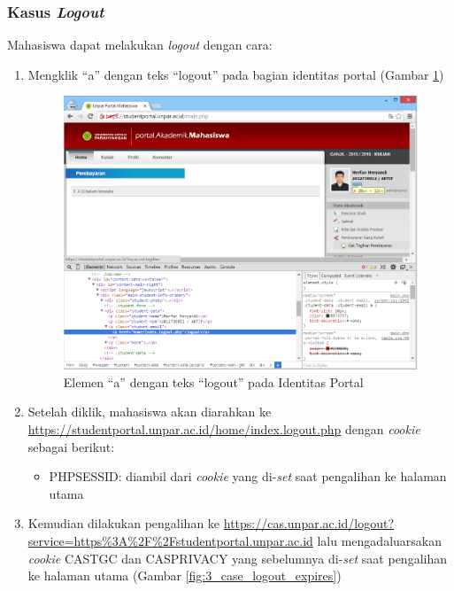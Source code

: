 \subsubsection{Kasus \textit{Logout}}
Mahasiswa dapat melakukan \textit{logout} dengan cara:
\begin{enumerate}
	\item Mengklik ``a'' dengan teks ``logout'' pada bagian identitas portal (Gambar \ref{fig:3_case_logout_link})
	\begin{figure}[H]
			\centering
			\includegraphics[scale=0.4]{Gambar/case-logout-link}
			\caption{Elemen ``a'' dengan teks ``logout'' pada Identitas Portal} 
			\label{fig:3_case_logout_link}
		\end{figure}
	\item Setelah diklik, mahasiswa akan diarahkan ke \url{https://studentportal.unpar.ac.id/home/index.logout.php} dengan \textit{cookie} sebagai berikut:
		\begin{itemize}
			\item PHPSESSID: diambil dari \textit{cookie} yang di-\textit{set} saat pengalihan ke halaman utama
		\end{itemize} 
	\item Kemudian dilakukan pengalihan ke \url{https://cas.unpar.ac.id/logout?service=https\%3A\%2F\%2Fstudentportal.unpar.ac.id} lalu mengadaluarsakan \textit{cookie} CASTGC dan CASPRIVACY yang sebelumnya di-\textit{set} saat pengalihan ke halaman utama (Gambar \ref{fig:3_case_logout_expires}) 
			\begin{figure}[H]
				\centering

\end{figure}
\end{enumerate}
